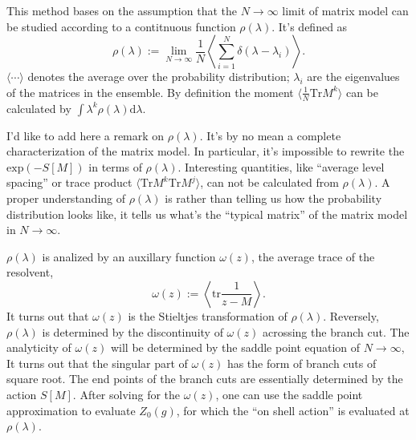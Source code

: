 This method bases on the assumption that
the $N\to\infty$ limit of matrix model can be studied according to a contitnuous function $\rho(\lambda)$.
It's defined as
\begin{equation*}
    \rho(\lambda) := \lim_{N\to\infty} \frac{1}{N}\left\langle \sum_{i=1}^N \delta(\lambda - \lambda_i) \right\rangle.
\end{equation*}
$\langle\cdots\rangle$ denotes the average over the probability distribution;
$\lambda_i$ are the eigenvalues of the matrices in the ensemble.
By definition the moment $\langle \frac{1}{N} \mathrm{Tr} M^k \rangle$ can be calculated by $\int \lambda^k \rho(\lambda)\mathrm{d}\lambda$.

I'd like to add here a remark on $\rho(\lambda)$.
It's by no mean a complete characterization of the matrix model.
In particular, it's impossible to rewrite the $\mathrm{exp}(-S[M])$ in terms of $\rho(\lambda)$.
Interesting quantities, like ``average level spacing'' or trace product $\langle\mathrm{Tr} M^k \mathrm{Tr} M^j\rangle$, can not be calculated from $\rho(\lambda)$.
A proper understanding of $\rho(\lambda)$ is
rather than telling us how the probability distribution looks like,
it tells us what's the ``typical matrix'' of the matrix model in $N\to\infty$.

$\rho(\lambda)$ is analized by an auxillary function $\omega(z)$, the average trace of the resolvent,
\begin{equation}
	\omega(z) := \left\langle \mathrm{tr}\frac{1}{z - M} \right\rangle
.\end{equation}
It turns out that $\omega(z)$ is the Stieltjes transformation of $\rho(\lambda)$.
Reversely, $\rho(\lambda)$ is determined by the discontinuity of $\omega(z)$ acrossing the branch cut.
The analyticity of $\omega(z)$ will be determined by the saddle point equation of $N\to\infty$,
It turns out that the singular part of $\omega(z)$ has the form of branch cuts of square root.
The end points of the branch cuts are essentially determined by the action $S[M]$.
After solving for the $\omega(z)$,
one can use the saddle point approximation to evaluate $Z_0(g)$,
for which the ``on shell action'' is evaluated at $\rho(\lambda)$. 

